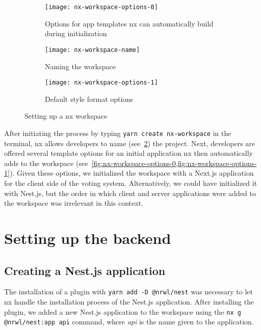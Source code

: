 \begin{figure}[h]
    \begin{subfigure}[b]{\textwidth}
        \centering
        \texttt{[image: nx-workspace-options-0]}
        \caption{Options for app templates nx can automatically build during initialization}
        \label{fig:nx-workspace-options-0}
    \end{subfigure}
    \begin{subfigure}[b]{0.5\textwidth}
        \centering
        \texttt{[image: nx-workspace-name]}
        \caption{Naming the workspace}
        \label{fig:nx-workspace-name}
    \end{subfigure}
    \begin{subfigure}[b]{0.5\textwidth}
        \centering
        \texttt{[image: nx-workspace-options-1]}
        \caption{Default style format options}
        \label{fig:nx-workspace-options-1}
    \end{subfigure}
    \caption{Setting up a nx workspace}
    \label{fig:setting-up-nx-workspace}
\end{figure}

After initiating the process by typing \texttt{yarn create nx-workspace} in the terminal, nx allows developers to name (see~\cref{fig:nx-workspace-name}) the project.
Next, developers are offered several template options for an initial application nx then automatically adds to the workspace (see~\cref{fig:nx-workspace-options-0,fig:nx-workspace-options-1}).
Given these options, we initialized the workspace with a Next.js application for the client side of the voting system.
Alternatively, we could have initialized it with Nest.js, but the order in which client and server applications were added to the workspace was irrelevant in this context.

\section{Setting up the backend}\label{sec:setting-up-a-nest.js-backend}

\subsection{Creating a Nest.js application}\label{subsec:creating-a-nest.js-application}

The installation of a plugin with \texttt{yarn add -D @nrwl/nest} was necessary to let nx handle the installation process of the Nest.js application.
After installing the plugin, we added a new Nest.js application to the workspace using the \texttt{nx g @nrwl/nest:app api} command, where \emph{api} is the name given to the application.

